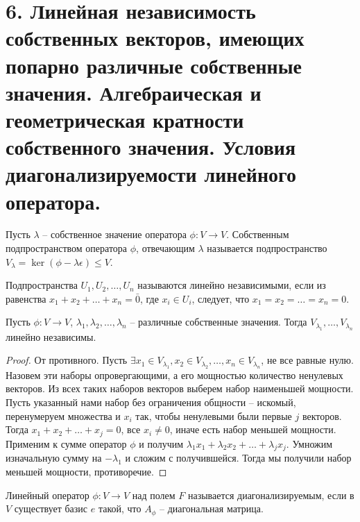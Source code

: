 \section{6. Линейная независимость собственных векторов, имеющих попарно различные собственные значения. Алгебраическая и геометрическая кратности собственного значения. Условия диагонализируемости линейного оператора.}

\begin{definition}
    Пусть $\lambda$ -- собственное значение оператора $\phi: V \to V$. Собственным подпространством 
    оператора $\phi$, отвечающим $\lambda$ называется подпространство 
    $V_{\lambda} = \ker (\phi - \lambda \epsilon) \leq V$.
\end{definition}

\begin{definition}
    Подпространства $U_1, U_2, \ldots, U_n$ называются линейно независимыми, если из равенства 
    $x_1 + x_2 + \dots + x_n = \bar{0}$, где $x_i \in U_i$, следует, что $x_1 = x_2 = \dots = x_n = 0$.
\end{definition}

\begin{theorem}
    \label{o_lnz}
    Пусть $\phi: V \to V$, $\lambda_1, \lambda_2, \dots, \lambda_n$ -- различные собственные значения. 
    Тогда $V_{\lambda_1}, \ldots, V_{\lambda_n}$ линейно независимы.
\end{theorem}

\begin{proof}
    От противного. Пусть $\exists x_1 \in V_{\lambda_1}, x_2 \in V_{\lambda_2}, \dots, 
    x_n \in V_{\lambda_n}$, не все равные нулю. 
    Назовем эти наборы опровергающими, а его мощностью количество ненулевых векторов. 
    Из всех таких наборов векторов выберем набор наименьшей мощности. Пусть 
    указанный нами набор без ограничения общности -- искомый, перенумеруем множества и $x_i$ так,
    чтобы ненулевыми были первые $j$ векторов. Тогда $x_1 + x_2 + \dots + x_j = 0$, все
    $x_i \neq 0$, иначе есть набор меньшей мощности. Применим к сумме оператор $\phi$ и получим $\lambda_1 x_1 + \lambda_2 x_2 + \ldots + \lambda_j x_j$. Умножим изначальную сумму на $-\lambda_1$
    и сложим с получившейся. Тогда мы получили набор меньшей мощности, противоречие.
\end{proof}

\begin{definition}
    Линейный оператор $\phi: V \to V$ над полем $F$ называется диагонализируемым, если в $V$ 
    существует базис $e$ такой, что $A_{\phi}$ -- диагональная матрица.
\end{definition}

